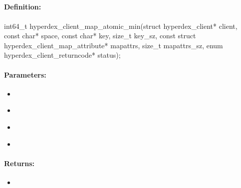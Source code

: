 \pagebreak
\subsection{}
\label{api:c:map_atomic_min}


\paragraph{Definition:}
\begin{ccode}
int64_t hyperdex_client_map_atomic_min(struct hyperdex_client* client,
        const char* space,
        const char* key, size_t key_sz,
        const struct hyperdex_client_map_attribute* mapattrs, size_t mapattrs_sz,
        enum hyperdex_client_returncode* status);
\end{ccode}

\paragraph{Parameters:}
\begin{itemize}[noitemsep]
\item {}\\

\item {}\\

\item {}\\

\item {}\\

\end{itemize}

\paragraph{Returns:}
\begin{itemize}[noitemsep]
\item {}\\

\end{itemize}

